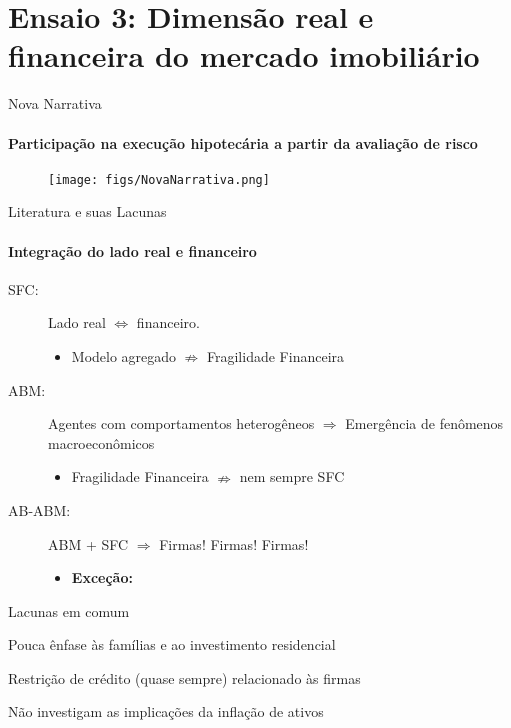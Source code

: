 \section[AB-SFC]{\textbf{Ensaio 3:} Dimensão real e financeira do mercado imobiliário}

\begin{frame}{Nova Narrativa}
\framesubtitle{Participação na execução hipotecária a partir da avaliação de risco}


\begin{figure}
    \centering
    \texttt{[image: figs/NovaNarrativa.png]}
\end{figure}

\end{frame}

\begin{frame}{Literatura e suas Lacunas}
\framesubtitle{Integração do lado real e financeiro}

\begin{description}
    \item[SFC:] Lado real $\Leftrightarrow$ financeiro.
    
    \begin{itemize}
        \item Modelo agregado $\nRightarrow$ Fragilidade Financeira
    \end{itemize}
    
    \item[ABM:] Agentes com comportamentos heterogêneos $\Rightarrow$ Emergência de fenômenos macroeconômicos
        \begin{itemize}
        \item Fragilidade Financeira $\nRightarrow$ nem sempre SFC
    \end{itemize}
    
    \item[AB-ABM:] ABM + SFC $\Rightarrow$ Firmas! Firmas! Firmas!
        \begin{itemize}
        \item \textbf{Exceção:} \textcite{carvalho_income_2014}
    \end{itemize}
    
\end{description}
    
\begin{alert}{Lacunas em comum}

Pouca ênfase às famílias e ao investimento residencial

Restrição de crédito (quase sempre) relacionado às firmas

Não investigam as implicações da inflação de ativos

\end{alert}
    
\end{frame}


